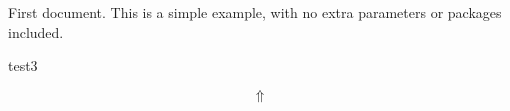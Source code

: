 \documentclass{article}
\begin{document}
First document. This is a simple example, with no
extra parameters or packages included.

test3

\[
    \Uparrow 
\]
\end{document}
